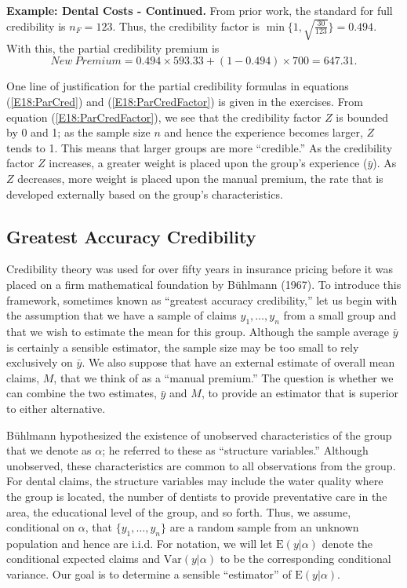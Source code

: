 \linejed

\textbf{Example: Dental Costs - Continued.} From prior work, the
standard for full credibility is $n_F = 123$. Thus, the credibility
factor is $\min\{1,\sqrt{\frac{30}{123}} \} = 0.494.$ With this, the
partial credibility premium is
\begin{equation*}
New~Premium =  0.494 \times 593.33 + (1 - 0.494)  \times 700 =
647.31.
\end{equation*}

\linejed

One line of justification for the partial credibility formulas in
equations (\ref{E18:ParCred}) and (\ref{E18:ParCredFactor}) is given
in the exercises. From equation (\ref{E18:ParCredFactor}), we see
that the credibility factor $Z$ is bounded by 0 and 1; as the sample
size $n$ and hence the experience becomes larger, $Z$ tends to 1.
This means that larger groups are more ``credible.'' As the
credibility factor $Z$ increases, a greater weight is placed upon
the group's experience ($\bar{y}$). As $Z$ decreases, more weight is
placed upon the manual premium, the rate that is developed
externally based on the group's characteristics.


\subsection{Greatest Accuracy Credibility}\label{S18:GreatestAccCred}

Credibility theory was used for over fifty years in insurance
pricing before it was placed on a firm mathematical foundation by
B\"{u}hlmann (1967). To introduce this framework, sometimes known as
``greatest accuracy credibility,'' let us begin with the assumption
that we have a sample of claims $y_1, \ldots, y_n$ from a small
group and that we wish to estimate the mean for this group. Although
the sample average $\bar{y}$ is certainly a sensible estimator, the
sample size may be too small to rely exclusively on $\bar{y}$. We
also suppose that have an external estimate of overall mean claims,
$M$, that we think of as a ``manual premium.'' The question is
whether we can combine the two estimates, $\bar{y}$ and $M$, to
provide an estimator that is superior to either alternative.

B\"{u}hlmann hypothesized the existence of unobserved
characteristics of the group that we denote as $\alpha$; he referred
to these as ``structure variables.'' Although unobserved, these
characteristics are common to all observations from the group. For
dental claims, the structure variables may include the water quality
where the group is located, the number of dentists to provide
preventative care in the area, the educational level of the group,
and so forth. Thus, we assume, conditional on $\alpha$, that $\{y_1,
\ldots, y_n\}$ are a random sample from an unknown population and
hence are i.i.d. For notation, we will let $\mathrm{E}(y | \alpha)$
denote the conditional expected claims and $\mathrm{Var}(y |
\alpha)$ to be the corresponding conditional variance. Our goal is
to determine a sensible ``estimator'' of $\mathrm{E}(y | \alpha)$.

